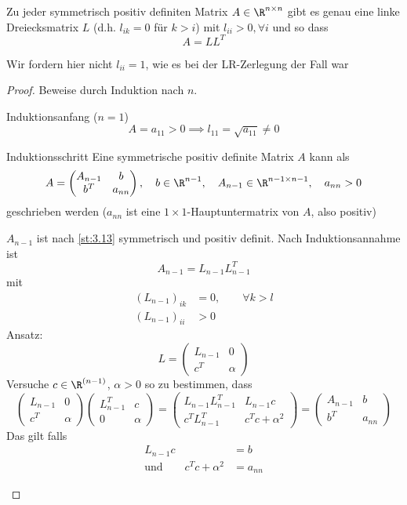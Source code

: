 \documentclass[a4paper]{scrartcl}
\numberwithin{equation}{section}
\begin{document}
\begin{st}
	\label{st:3.14}
	Zu jeder symmetrisch positiv definiten Matrix $A\in \R^{n\times n}$ gibt es genau eine linke Dreiecksmatrix $L$ (d.h. $l_{ik} = 0$ für $k>i$) mit $l_{ii} > 0, \forall i$ und so dass 
	\[
		A = LL^T
	\]
	\begin{note}
		Wir fordern hier nicht $l_{ii}=1$, wie es bei der LR-Zerlegung der Fall war
	\end{note}
	\begin{proof}
		Beweise durch Induktion nach $n$.

		\begin{seg}{Induktionsanfang ($n=1$)}
		\[
			A = a_{11} > 0 \implies l_{11} = \sqrt{a_{11}} \neq 0
		\]
		\end{seg}
		\begin{seg}{Induktionsschritt}
		Eine symmetrische positiv definite Matrix $A$ kann als
		\[
			A = \begin{pmatrix} A_{n-1} & b \\ b^T & a_{nn}\end{pmatrix},\quad b\in \R^{n-1},\quad A_{n-1}\in \R^{n-1\times n-1},\quad a_{nn} > 0
		\]
		geschrieben werden ($a_{nn}$ ist eine $1\times 1$-Hauptuntermatrix von $A$, also positiv)

		$A_{n-1}$ ist nach \ref{st:3.13} symmetrisch und positiv definit.
		Nach Induktionsannahme ist
		\[
			A_{n-1} = L_{n-1}L_{n-1}^T
		\]
		mit
		\begin{align*}
			(L_{n-1})_{ik} &= 0, \qquad \forall k > l\\
			(L_{n-1})_{ii} &> 0
		\end{align*}
		Ansatz:
		\[
			L = \begin{pmatrix} L_{n-1} & 0 \\ c^T & \alpha \end{pmatrix}
		\]
		Versuche $c\in \R^{(n-1)}$, $\alpha > 0$ so zu bestimmen, dass
		\begin{equation}
			\label{eq:3.14.6}
			\begin{pmatrix}L_{n-1} & 0 \\ c^T & \alpha\end{pmatrix}
			\begin{pmatrix}L_{n-1}^T & c \\ 0 & \alpha\end{pmatrix}
			= \begin{pmatrix}L_{n-1}L_{n-1}^T & L_{n-1}c \\ c^TL_{n-1}^T & c^Tc + \alpha^2\end{pmatrix}
			= \begin{pmatrix}A_{n-1} & b \\ b^T & a_{nn}\end{pmatrix}
		\end{equation}
		Das gilt falls
		\begin{align*}
			\label{eq:3.14.6b}
			L_{n-1}c &= b \tag{3.6b}\\
	\text{und}\qquad c^Tc + \alpha^2 &= a_{nn}
		\end{align*}


\end{seg}
\end{proof}
\end{st}
\end{document}
